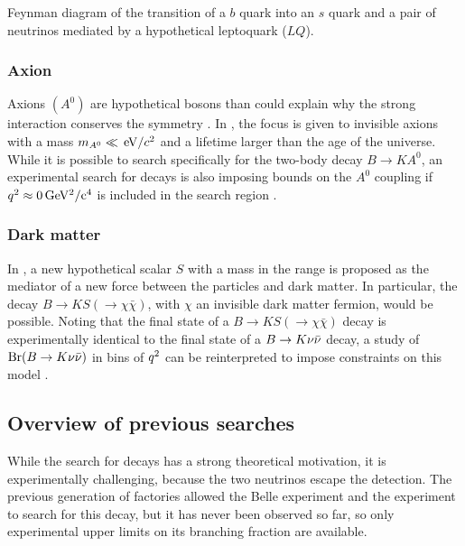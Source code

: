 {Feynman diagram of the transition of a $b$ quark into an $s$ quark and a pair of neutrinos mediated by a hypothetical leptoquark ($LQ$).}
\subsubsection*{Axion}
Axions $(A^0)$ are hypothetical bosons than could explain why the strong interaction conserves the \CP symmetry \cite{Peccei:1977hh, Peccei:1977ur, Weinberg:1977ma, Wilczek:1977pj}.
In \cite{MartinCamalich:2020dfe}, the focus is given to invisible axions with a mass $m_{A^0}\ll \mathrm{\,e\kern -0.1em V}/c^2$ and a lifetime larger than the age of the universe.
While it is possible to search specifically for the two-body decay $B\to K A^0$, an experimental search for \BKnn decays is also imposing bounds on the $A^0$ coupling if $q^2\approx 0\,\mathrm{GeV^2/c^4}$ is included in the search region \cite{MartinCamalich:2020dfe}.

\subsubsection*{Dark matter}
In \cite{Filimonova:2019tuy}, a new hypothetical scalar $S$ with a mass in the \gevcc range is proposed as the mediator of a new force between the \SM particles and dark matter.
In particular, the decay $B\to KS(\to \chi \bar{\chi})$, with $\chi$ an invisible dark matter fermion, would be possible.
Noting that the final state of a $B\to KS(\to \chi \bar{\chi})$ decay is experimentally identical to the final state of a $B\rightarrow K\nu\bar{\nu}$ decay, a study of $\mathrm{\mathrm{Br}}(B\rightarrow K\nu\bar{\nu})$ in bins of $q^2$ can be reinterpreted to impose constraints on this model \cite{Filimonova:2019tuy}.
\subsection{Overview of previous searches} \label{sec:previous_searches}
While the search for \BKnn decays has a strong theoretical motivation, it is experimentally challenging, because the two neutrinos escape the detection.
The previous generation of \B factories allowed the Belle experiment and the \babar experiment to search for this decay, but it has never been observed so far, so only experimental upper limits on its branching fraction are available.

